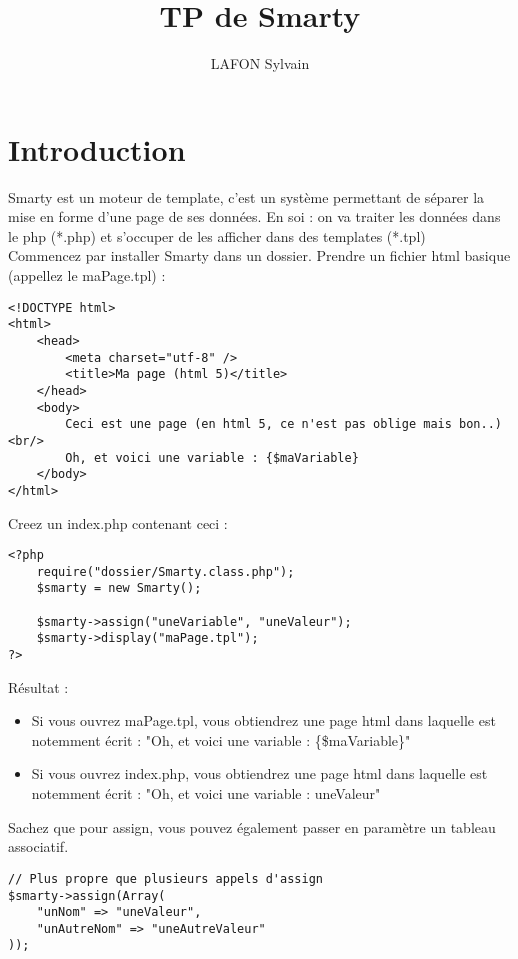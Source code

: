 \documentclass[10pt,a4paper]{article}
\author{LAFON Sylvain}
\title{TP de Smarty}
\begin{document}
	\maketitle
	\tableofcontents
	\newpage
	\part{Introduction}
Smarty est un moteur de template, c'est un système permettant de séparer la mise en forme d'une page de ses données.
En soi : on va traiter les données dans le php (*.php) et s'occuper de les afficher dans des templates (*.tpl)\\

Commencez par installer Smarty dans un dossier.
Prendre un fichier html basique (appellez le maPage.tpl) :
	\lstset{language=html}	
	\begin{lstlisting}
<!DOCTYPE html>
<html>
    <head>
        <meta charset="utf-8" />
        <title>Ma page (html 5)</title>
    </head>
    <body>
    	Ceci est une page (en html 5, ce n'est pas oblige mais bon..)<br/>
    	Oh, et voici une variable : {$maVariable}
    </body>
</html>
	\end{lstlisting}
Creez un index.php contenant ceci :
	\lstset{language=php}
	\begin{lstlisting}
<?php
	require("dossier/Smarty.class.php");
	$smarty = new Smarty();
	
	$smarty->assign("uneVariable", "uneValeur");
	$smarty->display("maPage.tpl");
?>
	\end{lstlisting}
	
	Résultat :
	\begin{itemize}
	\item Si vous ouvrez maPage.tpl, vous obtiendrez une page html dans laquelle est notemment écrit : "Oh, et voici une variable : \{\$maVariable\}"
	\item Si vous ouvrez index.php, vous obtiendrez une page html dans laquelle est notemment écrit : "Oh, et voici une variable : uneValeur"\\
	\end{itemize}
		
	Sachez que pour assign, vous pouvez également passer en paramètre un tableau associatif.\\
	
	\begin{lstlisting}
// Plus propre que plusieurs appels d'assign
$smarty->assign(Array(
	"unNom" => "uneValeur",
	"unAutreNom" => "uneAutreValeur"
));
	\end{lstlisting}
	
\end{document}
